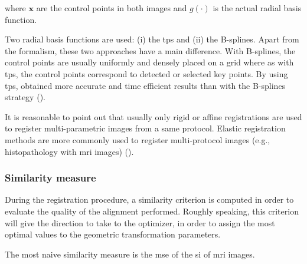 \noindent where $\mathbf{x}$ are the control points in both images and $g(\cdot)$ is the actual radial basis function. 

Two radial basis functions are used: (i) the \ac{tps} and (ii) the B-splines. Apart from the formalism, these two approaches have a main difference. With B-splines, the control points are usually uniformly and densely placed on a grid where as with \ac{tps}, the control points correspond to detected or selected key points. By using \ac{tps}, \cite{Mitra2011} obtained more accurate and time efficient results than with the B-splines strategy (\cite{Mitra2012a}). %

It is reasonable to point out that usually only rigid or affine registrations are used to register multi-parametric images from a same protocol. Elastic registration methods are more commonly used to register multi-protocol images (e.g., histopathology with \ac{mri} images) (\cite{Toth2008,Toth2009}).

\subsubsection{Similarity measure}\label{subsubsec:simmea}

During the registration procedure, a similarity criterion is computed in order to evaluate the quality of the alignment performed. Roughly speaking, this criterion will give the direction to take to the optimizer, in order to assign the most optimal values to the geometric transformation parameters.

The most naive similarity measure is the \acf{mse} of the \ac{si} of \ac{mri} images.%

%

